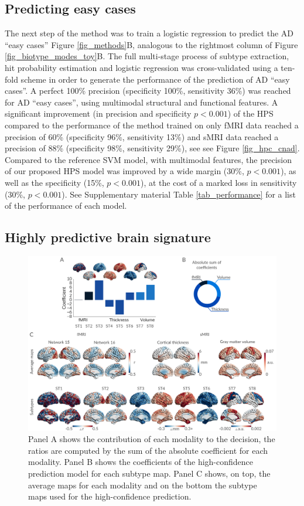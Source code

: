 \documentclass[authoryear]{elsarticle}
\begin{document}
\subsection*{Predicting easy cases}
The next step of the method was to train a logistic regression \citep{Fan2008} to predict the AD ``easy cases'' Figure \ref{fig_methods}B, analogous to the rightmost column of Figure \ref{fig_biotype_modes_toy}B. The full multi-stage process of subtype extraction, hit probability estimation and logistic regression was cross-validated using a ten-fold scheme in order to generate the performance of the prediction of AD ``easy cases''. A perfect 100\% precision (specificity 100\%, sensitivity 36\%) was reached for AD ``easy cases'', using multimodal structural and functional features. A significant improvement (in precision and specificity $p<0.001$)  of the HPS compared to the performance of the method trained on only fMRI data reached a precision of 60\% (specificity 96\%, sensitivity 13\%) and sMRI data reached a precision of 88\% (specificity 98\%, sensitivity 29\%), see see Figure \ref{fig_hpc_cnad}. Compared to the reference SVM model, with multimodal features, the precision of our proposed HPS model was improved by a wide margin (30\%, $p<0.001$),  as well as the specificity (15\%, $p<0.001$), at the cost of a marked loss in sensitivity (30\%, $p<0.001$). See Supplementary material Table \ref{tab_performance} for a list of the performance of each model.


\subsection*{Highly predictive brain signature}
\begin{figure}[ht]
\centering
\includegraphics[width=\linewidth]{figures/confidence_features.png}
\caption{Panel A shows the contribution of each modality to the decision, the ratios are computed by the sum of the absolute coefficient for each modality. Panel B shows the coefficients of the high-confidence prediction model for each subtype map. Panel C shows, on top, the average maps for each modality and on the bottom the subtype maps used for the high-confidence prediction.}
\label{fig_features_maps}
\end{figure}
\end{document}
